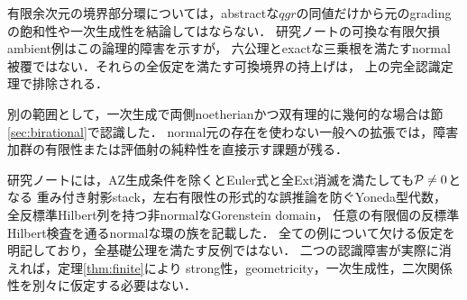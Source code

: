 \documentclass[11pt,a4paper]{ltjsarticle}
\begin{document}
有限余次元の境界部分環については，abstractな$qgr$の同値だけから元のgradingの飽和性や一次生成性を結論してはならない．
研究ノートの可換な有限欠損ambient例はこの論理的障害を示すが，
六公理とexactな三乗根を満たすnormal被覆ではない．それらの全仮定を満たす可換境界の持上げは，
上の完全認識定理で排除される．

別の範囲として，一次生成で両側noetherianかつ双有理的に幾何的な場合は節\ref{sec:birational}で認識した．
normal元の存在を使わない一般への拡張では，障害加群の有限性または評価射の純粋性を直接示す課題が残る．

研究ノートには，AZ生成条件を除くとEuler式と全Ext消滅を満たしても$\mathcal P\ne0$となる
重み付き射影stack，左右有限性の形式的な誤推論を防ぐYoneda型代数，
全反標準Hilbert列を持つ非normalなGorenstein domain，
任意の有限個の反標準Hilbert検査を通るnormalな環の族を記載した．
全ての例について欠ける仮定を明記しており，全基礎公理を満たす反例ではない．
二つの認識障害が実際に消えれば，定理\ref{thm:finite}により
strong性，geometricity，一次生成性，二次関係性を別々に仮定する必要はない．
\end{document}

